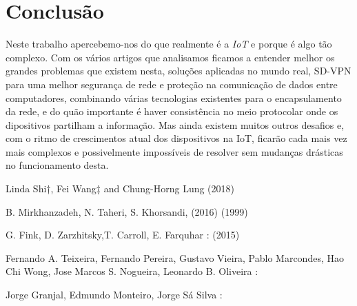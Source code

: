 \documentclass{llncs}
\begin{document}

\section{Conclusão}
Neste trabalho apercebemo-nos do que realmente é a \textit{IoT} e porque é algo tão complexo. Com os vários artigos que analisamos ficamos a entender melhor os grandes problemas que existem nesta, soluções aplicadas no mundo real, SD-VPN para uma melhor segurança de rede e proteção na comunicação de dados entre computadores, combinando várias tecnologias existentes para o encapsulamento da rede, e do quão importante é haver consistência no meio protocolar onde os dipositivos partilham a informação.
Mas ainda existem muitos outros desafios e, com o ritmo de crescimentos atual dos dispositivos na IoT, ficarão cada mais vez mais complexos e possivelmente impossíveis de resolver sem mudanças drásticas no funcionamento desta.\cite{Fink}

\begin{thebibliography}{1}
Linda Shi†, Fei Wang‡ and Chung-Horng Lung
 (2018)

B. Mirkhanzadeh, N. Taheri, S. Khorsandi,
 (2016)
 (1999)

G. Fink, D. Zarzhitsky,T. Carroll, E. Farquhar :
 (2015)

Fernando A. Teixeira, Fernando Pereira, Gustavo Vieira, Pablo Marcondes, Hao Chi Wong, Jose Marcos S. Nogueira, Leonardo B. Oliveira :

Jorge Granjal, Edmundo Monteiro, Jorge Sá Silva :

\end{thebibliography}
\end{document}
